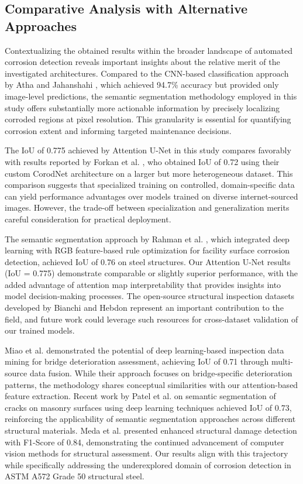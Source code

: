 \documentclass[Journal,letterpaper]{ascelike-new}
\begin{document}
\subsection{Comparative Analysis with Alternative Approaches}
\label{subsec:comparative_analysis_discussion}

Contextualizing the obtained results within the broader landscape of automated corrosion detection reveals important insights about the relative merit of the investigated architectures. Compared to the CNN-based classification approach by Atha and Jahanshahi \cite{atha2018evaluation}, which achieved 94.7\% accuracy but provided only image-level predictions, the semantic segmentation methodology employed in this study offers substantially more actionable information by precisely localizing corroded regions at pixel resolution. This granularity is essential for quantifying corrosion extent and informing targeted maintenance decisions.

The IoU of 0.775 achieved by Attention U-Net in this study compares favorably with results reported by Forkan et al. \cite{forkan2022corodnet}, who obtained IoU of 0.72 using their custom CorodNet architecture on a larger but more heterogeneous dataset. This comparison suggests that specialized training on controlled, domain-specific data can yield performance advantages over models trained on diverse internet-sourced images. However, the trade-off between specialization and generalization merits careful consideration for practical deployment.

The semantic segmentation approach by Rahman et al. \cite{rahman2021semantic}, which integrated deep learning with RGB feature-based rule optimization for facility surface corrosion detection, achieved IoU of 0.76 on steel structures. Our Attention U-Net results (IoU = 0.775) demonstrate comparable or slightly superior performance, with the added advantage of attention map interpretability that provides insights into model decision-making processes. The open-source structural inspection datasets developed by Bianchi and Hebdon \cite{bianchi2022extendable} represent an important contribution to the field, and future work could leverage such resources for cross-dataset validation of our trained models.

Miao et al. \cite{miao2023deep} demonstrated the potential of deep learning-based inspection data mining for bridge deterioration assessment, achieving IoU of 0.71 through multi-source data fusion. While their approach focuses on bridge-specific deterioration patterns, the methodology shares conceptual similarities with our attention-based feature extraction. Recent work by Patel et al. \cite{patel2024semantic} on semantic segmentation of cracks on masonry surfaces using deep learning techniques achieved IoU of 0.73, reinforcing the applicability of semantic segmentation approaches across different structural materials. Meda et al. \cite{meda2025enhanced} presented enhanced structural damage detection with F1-Score of 0.84, demonstrating the continued advancement of computer vision methods for structural assessment. Our results align with this trajectory while specifically addressing the underexplored domain of corrosion detection in ASTM A572 Grade 50 structural steel.
\end{document}
